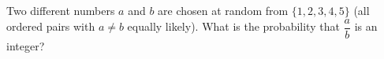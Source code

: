 Two different numbers $a$ and $b$ are chosen at random from $\{1,2,3,4,5\}$ (all ordered pairs with $a\ne b$ equally likely). What is the probability that $\dfrac ab$ is an integer?
